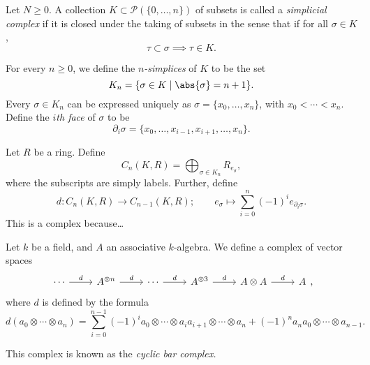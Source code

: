 \documentclass[main.tex]{subfiles}
\begin{document}
\begin{example}
  Let $N \geq 0$. A collection $K \subset \mathcal{P}(\{0, \ldots, n\})$ of subsets is called a \emph{simplicial complex} if it is closed under the taking of subsets in the sense that if for all $\sigma \in K$,
  \begin{equation*}
    \tau \subset \sigma \implies \tau \in K.
  \end{equation*}

  For every $n \geq 0$, we define the \emph{$n$-simplices} of $K$ to be the set
  \begin{equation*}
    K_{n} = \{\sigma \in K \mid \abs{\sigma} = n+1 \}.
  \end{equation*}
  Every $\sigma \in K_{n}$ can be expressed uniquely as $\sigma = \{x_{0}, \ldots, x_{n}\}$, with $x_{0} < \cdots < x_{n}$. Define the \emph{$i$th face} of $\sigma$ to be
  \begin{equation*}
    \partial_{i} \sigma = \{x_{0}, \ldots, x_{i-1}, x_{i+1}, \ldots, x_{n}\}.
  \end{equation*}

  Let $R$ be a ring. Define
  \begin{equation*}
    C_{n}(K, R) = \bigoplus_{\sigma \in K_{n}} R_{e_{\sigma}},
  \end{equation*}
  where the subscripts are simply labels. Further, define
  \begin{equation*}
    d\colon C_{n}(K, R) \to C_{n-1}(K, R);\qquad e_{\sigma} \mapsto \sum_{i = 0}^{n} (-1)^{i} e_{\partial_{i} \sigma}.
  \end{equation*}
  This is a complex because\dots
\end{example}

\begin{example}
  Let $k$ be a field, and $A$ an associative $k$-algebra. We define a complex of vector spaces
  \begin{equation*}
    \begin{tikzcd}
      \cdots
      \arrow[r, "d"]
      & A^{\otimes n}
      \arrow[r, "d"]
      & \cdots
      \arrow[r, "d"]
      & A^{\otimes 3}
      \arrow[r, "d"]
      & A \otimes A
      \arrow[r, "d"]
      & A
    \end{tikzcd},
  \end{equation*}
  where $d$ is defined by the formula
  \begin{equation*}
    d(a_{0} \otimes \cdots \otimes a_{n}) = \sum_{i = 0}^{n-1} (-1)^{i} a_{0} \otimes \cdots \otimes a_{i} a_{i+1} \otimes \cdots \otimes a_{n} + (-1)^{n}a_{n}a_{0} \otimes \cdots \otimes a_{n-1}.
  \end{equation*}

  This complex is known as the \emph{cyclic bar complex.}
\end{example}
\end{document}
